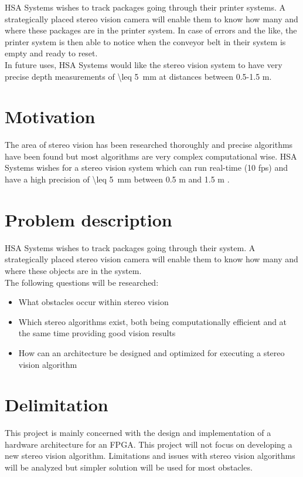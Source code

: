 HSA Systems wishes to track packages going through their printer systems. A strategically placed stereo vision camera will enable them to know how many and where these packages are in the printer system. In case of errors and the like, the printer system is then able to notice when the conveyor belt in their system is empty and ready to reset.\\

In future uses, HSA Systems would like the stereo vision system to have very precise depth measurements of \SI{\leq 5}{\milli\meter} at distances between 0.5-1.5 m.

\section{Motivation}\label{sec:intromotiv}
The area of stereo vision has been researched thoroughly and precise algorithms have been found but most algorithms are very complex computational wise. HSA Systems wishes for a stereo vision system which can run real-time (10 fps) \label{req:framerate} and have a high precision of \SI{\leq 5}{\milli\meter} between 0.5 m and 1.5 m \label{req:dispre}.

\section{Problem description}
HSA Systems wishes to track packages going through their system. A strategically placed stereo vision camera will enable them to know how many and where these objects are in the system. \\
The following questions will be researched:
\begin{itemize}
  \item What obstacles occur within stereo vision
  \item Which stereo algorithms exist, both being computationally efficient and at the same time providing good vision results
  \item How can an architecture be designed and optimized for executing a stereo vision algorithm
\end{itemize}

\section{Delimitation}
This project is mainly concerned with the design and implementation of a hardware architecture for an FPGA. This project will not focus on developing a new stereo vision algorithm. Limitations and issues with stereo vision algorithms will be analyzed but simpler solution will be used for most obstacles.

